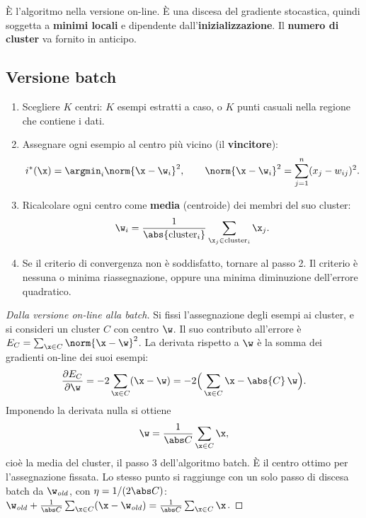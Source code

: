 È l'algoritmo  nella versione on-line. È una discesa del gradiente stocastica, quindi soggetta a
\textbf{minimi locali} e dipendente dall'\textbf{inizializzazione}. Il \textbf{numero di cluster} va fornito in
anticipo.

\subsection{Versione batch}

\begin{algoritmo}
\begin{enumerate}
  \item Scegliere $K$ centri: $K$ esempi estratti a caso, o $K$ punti casuali nella regione che contiene i dati.
  \item Assegnare ogni esempio al centro più vicino (il \textbf{vincitore}):
        \[
        i^*(\x) = \argmin_i\norm{\x-\w_i}^2,\qquad \norm{\x-\w_i}^2 = \sum_{j=1}^{n}(x_j-w_{ij})^2 .
        \]
  \item Ricalcolare ogni centro come \textbf{media} (centroide) dei membri del suo cluster:
        \[
        \w_i = \frac{1}{\abs{\mathrm{cluster}_i}}\sum_{\x_j\in\mathrm{cluster}_i}\x_j .
        \]
  \item Se il criterio di convergenza non è soddisfatto, tornare al passo 2. Il criterio è nessuna o minima
        riassegnazione, oppure una minima diminuzione dell'errore quadratico.
\end{enumerate}
\end{algoritmo}

\begin{proof}[Dalla versione on-line alla batch]
Si fissi l'assegnazione degli esempi ai cluster, e si consideri un cluster $C$ con centro $\w$. Il suo contributo
all'errore è $E_C = \sum_{\x\in C}\norm{\x-\w}^2$. La derivata rispetto a $\w$ è la somma dei gradienti on-line dei
suoi esempi:
\[
\frac{\partial E_C}{\partial\w} = -2\sum_{\x\in C}(\x-\w) = -2\Big(\sum_{\x\in C}\x - \abs{C}\,\w\Big).
\]
Imponendo la derivata nulla si ottiene
\[
\w = \frac{1}{\abs C}\sum_{\x\in C}\x ,
\]
cioè la media del cluster, il passo 3 dell'algoritmo batch. È il centro ottimo per l'assegnazione fissata. Lo stesso
punto si raggiunge con un solo passo di discesa batch da $\w_{\mathit{old}}$, con $\eta = 1/(2\abs C)$:
$\w_{\mathit{old}} + \frac{1}{\abs C}\sum_{\x\in C}(\x-\w_{\mathit{old}}) = \frac{1}{\abs C}\sum_{\x\in C}\x$.
\end{proof}

